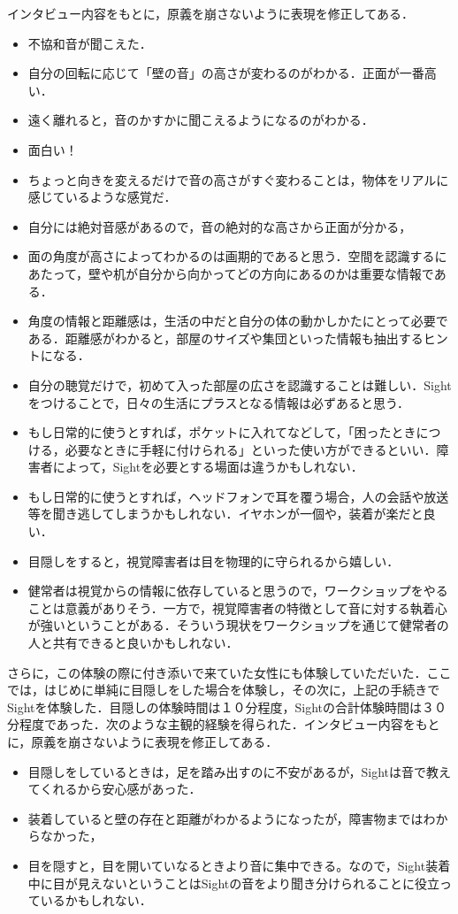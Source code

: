インタビュー内容をもとに，原義を崩さないように表現を修正してある．
\begin{itemize}
\item 不協和音が聞こえた．
\item 自分の回転に応じて「壁の音」の高さが変わるのがわかる．正面が一番高い．
\item 遠く離れると，音のかすかに聞こえるようになるのがわかる．
\item 面白い！
\item ちょっと向きを変えるだけで音の高さがすぐ変わることは，物体をリアルに感じているような感覚だ．
\item 自分には絶対音感があるので，音の絶対的な高さから正面が分かる，
\item 面の角度が高さによってわかるのは画期的であると思う．空間を認識するにあたって，壁や机が自分から向かってどの方向にあるのかは重要な情報である．
\item 角度の情報と距離感は，生活の中だと自分の体の動かしかたにとって必要である．距離感がわかると，部屋のサイズや集団といった情報も抽出するヒントになる．
\item 自分の聴覚だけで，初めて入った部屋の広さを認識することは難しい．Sightをつけることで，日々の生活にプラスとなる情報は必ずあると思う．
\item もし日常的に使うとすれば，ポケットに入れてなどして，「困ったときにつける，必要なときに手軽に付けられる」といった使い方ができるといい．障害者によって，Sightを必要とする場面は違うかもしれない．
\item もし日常的に使うとすれば，ヘッドフォンで耳を覆う場合，人の会話や放送等を聞き逃してしまうかもしれない．イヤホンが一個や，装着が楽だと良い．
\item 目隠しをすると，視覚障害者は目を物理的に守られるから嬉しい．
\item 健常者は視覚からの情報に依存していると思うので，ワークショップをやることは意義がありそう．一方で，視覚障害者の特徴として音に対する執着心が強いということがある．そういう現状をワークショップを通じて健常者の人と共有できると良いかもしれない．
\end{itemize}
さらに，この体験の際に付き添いで来ていた女性にも体験していただいた．ここでは，はじめに単純に目隠しをした場合を体験し，その次に，上記の手続きでSightを体験した．目隠しの体験時間は１０分程度，Sightの合計体験時間は３０分程度であった．次のような主観的経験を得られた．インタビュー内容をもとに，原義を崩さないように表現を修正してある．
\begin{itemize}
\item 目隠しをしているときは，足を踏み出すのに不安があるが，Sightは音で教えてくれるから安心感があった．
\item 装着していると壁の存在と距離がわかるようになったが，障害物まではわからなかった，
\item 目を隠すと，目を開いていなるときより音に集中できる。なので，Sight装着中に目が見えないということはSightの音をより聞き分けられることに役立っているかもしれない．
\end{itemize}
